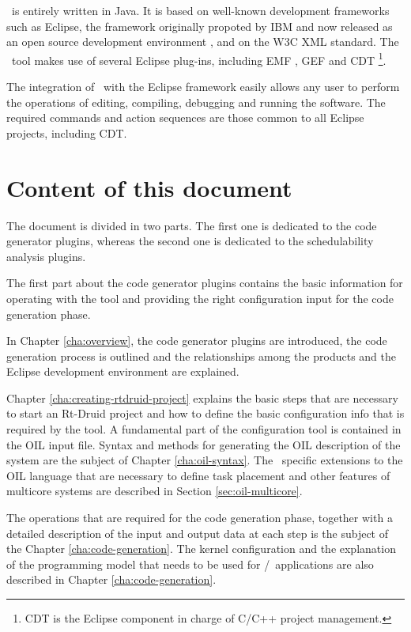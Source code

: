 \rtd\ is entirely written in Java. It is based on well-known
development frameworks such as Eclipse, the framework originally
propoted by IBM and now released as an open source development
environment \cite{Eclipse}, and on the W3C XML standard. The \rtd\ tool
makes use of several Eclipse plug-ins, including EMF
\cite{Eclipse-EMF}, GEF \cite{Eclipse-GEF} and CDT
\cite{Eclipse-CDT}\footnote{CDT is the Eclipse component in charge of
C/C++ project management.}.

The integration of \rtd\ with the Eclipse framework easily allows any
user to perform the operations of editing, compiling, debugging and
running the software. The required commands and action sequences are
those common to all Eclipse projects, including CDT.


\section{Content of this document}

The document is divided in two parts. The first one is
dedicated to the code generator plugins, whereas the second one is
dedicated to the schedulability analysis plugins.

The first part about the code generator plugins contains the basic
information for operating with the tool and providing the right
configuration input for the code generation phase. 

In Chapter \ref{cha:overview}, the code generator plugins are
introduced, the code generation process is outlined and the
relationships among the products and the Eclipse development
environment are explained.

Chapter \ref{cha:creating-rtdruid-project} explains the basic steps
that are necessary to start an Rt-Druid project and how to define the
basic configuration info that is required by the tool. A fundamental
part of the configuration tool is contained in the OIL input
file. Syntax and methods for generating the OIL description of the
system are the subject of Chapter \ref{cha:oil-syntax}. The
\ee\ specific extensions to the OIL language that are necessary to
define task placement and other features of multicore systems are
described in Section \ref{sec:oil-multicore}.

The operations that are required for the code generation phase,
together with a detailed description of the input and output data at
each step is the subject of the Chapter \ref{cha:code-generation}.
The kernel configuration and the explanation of the programming model
that needs to be used for \rtd/\ee\ applications are also described in
Chapter \ref{cha:code-generation}.

